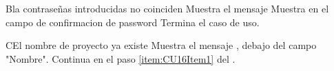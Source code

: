 		\begin{UCtrayectoriaA}{B}{la contraseñas introducidas no coinciden}
			\UCpaso Muestra el mensaje 
			\UCpaso Muestra en el campo de confirmacion de password
            \UCpaso[] Termina el caso de uso.
		\end{UCtrayectoriaA}
		\begin{UCtrayectoriaA}{C}{El nombre de proyecto ya existe}
			\UCpaso Muestra el mensaje  , debajo del campo "Nombre".
			\UCpaso[] Continua en el paso \ref{item:CU16Item1} del .
		\end{UCtrayectoriaA}


		
		
		
